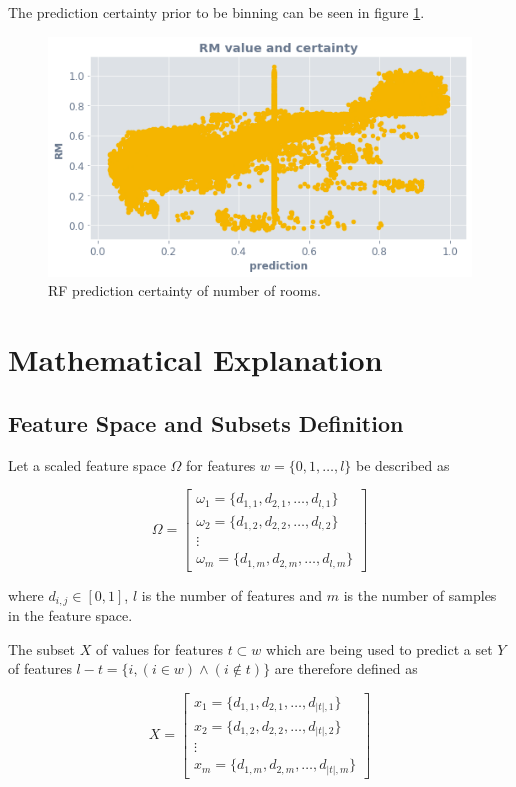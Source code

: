 \documentclass[a4paper, twocolumn]{article}
\begin{document}
The prediction certainty prior to be binning can be seen in figure \ref{fig:reg-rf-ocsvm-rm}.

\begin{figure}
\centering
\includegraphics[width=0.7\columnwidth]{img/reg_rf_ocsvm_rm.png}
\caption{RF prediction certainty of number of rooms.}
\label{fig:reg-rf-ocsvm-rm}
\end{figure}

\section{Mathematical Explanation}

\subsection{Feature Space and Subsets Definition}

Let a scaled feature space $\Omega$ for features $w = \{0, 1, \ldots, l\}$ be described as

$$\Omega =
\begin{bmatrix}
{\omega_1 = \{d_{1, 1}, d_{2, 1}, \ldots, d_{l, 1}\}} \\
{\omega_2 = \{d_{1, 2}, d_{2, 2}, \ldots, d_{l, 2}\}} \\
\vdots \\
{\omega_m = \{d_{1, m}, d_{2, m}, \ldots, d_{l, m}\}}
\end{bmatrix}
$$

where $d_{i, j} \in [0,1]$, $l$ is the number of features and $m$ is the number of samples in the feature space.

The subset $X$ of values for features $t \subset w$ which are being used to predict a set $Y$ of features $l - t = \{i, (i \in w) \land (i \notin t)\}$ are therefore defined as

$$X =
\begin{bmatrix}
{x_1 = \{d_{1, 1}, d_{2, 1}, \ldots, d_{|t|, 1}\}} \\
{x_2 = \{d_{1, 2}, d_{2, 2}, \ldots, d_{|t|, 2}\}} \\
\vdots \\
{x_m = \{d_{1, m}, d_{2, m}, \ldots, d_{|t|, m}\}}
\end{bmatrix}
$$
\end{document}
